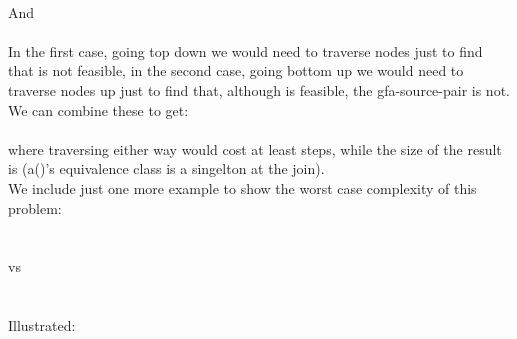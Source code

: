 \\
And\\
\\
In the first case, going top down we would need to traverse  nodes just to find that  is not feasible,
in the second case, going bottom up we would need to traverse  nodes up just to find that, although  is feasible,
the gfa-source-pair  is not. \\
We can combine these to get:\\
\\ 
where traversing either way would cost at least  steps, while the size of the result is  (a()'s equivalence class is a singelton at the join).\\
We include just one more example to show the worst case complexity of this problem:\\
\\
\\
vs\\
\\
\\
Illustrated:
